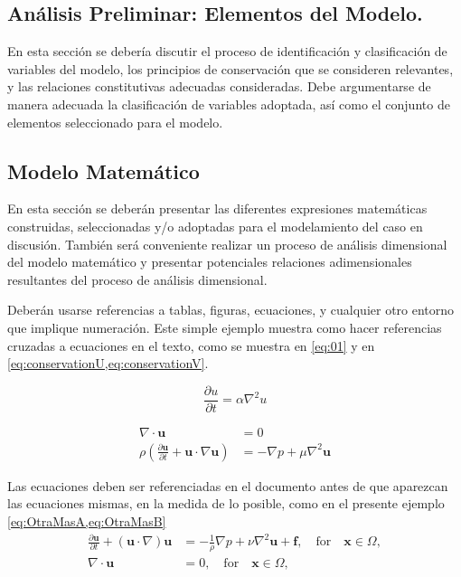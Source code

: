 \documentclass[11pt,stdletter,orderfromtodate,sigleft,twoside]{report}
\begin{document}
\lipsum[1]
\medskip

\subsection{An\'alisis Preliminar: Elementos del Modelo.}
En esta secci\'on se deber\'ia discutir el proceso de identificaci\'on y
clasificaci\'on de variables del modelo, los principios de conservaci\'on que
se consideren relevantes, y las relaciones constitutivas adecuadas
consideradas. Debe argumentarse de manera adecuada la clasificaci\'on de
variables adoptada, as\'i como el conjunto de elementos seleccionado para el
modelo.
\medskip

\lipsum[2]
\medskip

\subsection{Modelo Matem\'atico}
En esta secci\'on se deber\'an presentar las diferentes expresiones
matem\'aticas construidas, seleccionadas y/o adoptadas para el modelamiento del
caso en discusi\'on. Tambi\'en ser\'a conveniente realizar un proceso de
an\'alisis dimensional del modelo matem\'atico y presentar potenciales
relaciones adimensionales resultantes del proceso de an\'alisis dimensional.
\medskip

Deber\'an usarse referencias a tablas, figuras, ecuaciones, y cualquier otro
entorno que implique numeraci\'on. Este simple ejemplo muestra como hacer
referencias cruzadas a ecuaciones en el texto, como se muestra en \cref{eq:01}
y en \cref{eq:conservationU,eq:conservationV}.

\begin{equation}
    \frac{\partial u}{\partial t} = \alpha \nabla^2 u
    \label{eq:01}
\end{equation}

\begin{align}
\nabla \cdot \mathbf{u} &= 0 \label{eq:conservationU}\\
\rho \left( \frac{\partial \mathbf{u}}{\partial t} + \mathbf{u} \cdot \nabla \mathbf{u} \right) &= - \nabla p + \mu \nabla^2 \mathbf{u}\label{eq:conservationV}
\end{align}

\lipsum[3]

Las ecuaciones deben ser referenciadas en el documento antes de que aparezcan
las ecuaciones mismas, en la medida de lo posible, como en el presente ejemplo
\cref{eq:OtraMasA,eq:OtraMasB}
\begin{align}
\frac{\partial \mathbf{u}}{\partial t} + (\mathbf{u} \cdot \nabla) \mathbf{u} &= - \frac{1}{\rho} \nabla p + \nu \nabla^2 \mathbf{u} + \mathbf{f}, 
\quad \mathrm{for} \quad \mathbf{x} \in \Omega, \label{eq:OtraMasA} \\
\nabla \cdot \mathbf{u} &= 0, \quad \mathrm{for} \quad \mathbf{x} \in \Omega, \label{eq:OtraMasB} 
\end{align}
\end{document}
